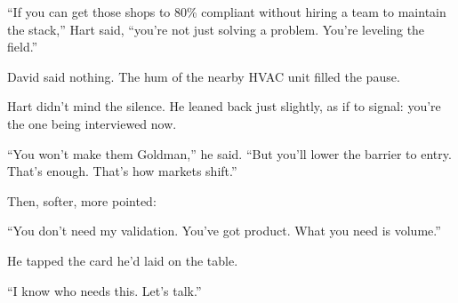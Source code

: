 ``If you can get those shops to 80\% compliant without hiring a team to maintain the stack,'' Hart said, ``you’re not 
just solving a problem. You’re leveling the field.''

David said nothing. The hum of the nearby HVAC unit filled the pause.

Hart didn’t mind the silence. He leaned back just slightly, as if to signal: you’re the one being interviewed now.

``You won’t make them Goldman,'' he said. ``But you’ll lower the barrier to entry. That’s enough. That’s how markets shift.''

Then, softer, more pointed:

``You don’t need my validation. You’ve got product. What you need is volume.''

He tapped the card he’d laid on the table.

``I know who needs this. Let’s talk.''

\medskip

